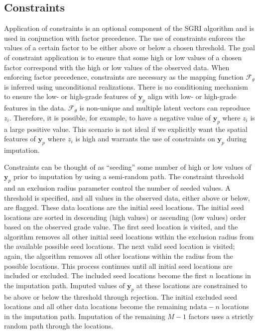 \subsection{Constraints}
\label{subsec:constraints}

Application of constraints is an optional component of the \gls{SGRI} algorithm and is used in conjunction with factor precedence. The use of constraints enforces the values of a certain factor to be either above or below a chosen threshold. The goal of constraint application is to ensure that some high or low values of a chosen factor correspond with the high or low values of the observed data. When enforcing factor precedence, constraints are necessary as the mapping function $\mathcal{F}_{\theta}$ is inferred using unconditional realizations. There is no conditioning mechanism to ensure the low- or high-grade features of $\mathbf{y}_{p}$ align with low- or high-grade features in the data. $\mathcal{F}_{\theta}$ is non-unique and multiple latent vectors can reproduce $z_{i}$. Therefore, it is possible, for example, to have a negative value of $\mathbf{y}_{p}$ where $z_{i}$ is a large positive value. This scenario is not ideal if we explicitly want the spatial features of $\mathbf{y}_{p}$ where $z_{i}$ is high and warrants the use of constraints on $\mathbf{y}_{p}$ during imputation.

Constraints can be thought of as ``seeding'' some number of high or low values of $\mathbf{y}_{p}$ prior to imputation by using a semi-random path. The constraint threshold and an exclusion radius parameter control the number of seeded values. A threshold is specified, and all values in the observed data, either above or below, are flagged. These data locations are the initial seed locations. The initial seed locations are sorted in descending (high values) or ascending (low values) order based on the observed grade value. The first seed location is visited, and the algorithm removes all other initial seed locations within the exclusion radius from the available possible seed locations. The next valid seed location is visited; again, the algorithm removes all other locations within the radius from the possible locations. This process continues until all initial seed locations are included or excluded. The included seed locations become the first $n$ locations in the imputation path. Imputed values of $\mathbf{y}_{p}$ at these locations are constrained to be above or below the threshold through rejection. The initial excluded seed locations and all other data locations become the remaining $\text{ndata} - n$ locations in the imputation path. Imputation of the remaining $M-1$ factors uses a strictly random path through the locations.

